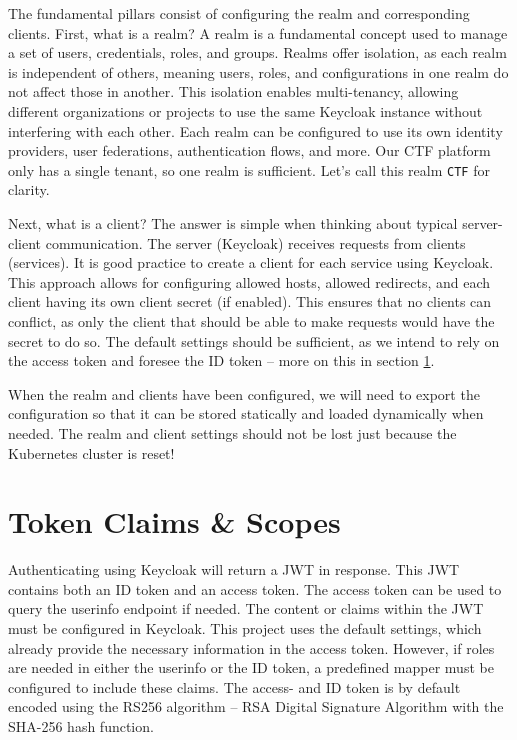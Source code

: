 The fundamental pillars consist of configuring the realm and corresponding clients. First, what is a realm? A realm is a fundamental concept used to manage a set of users, credentials, roles, and groups. Realms offer isolation, as each realm is independent of others, meaning users, roles, and configurations in one realm do not affect those in another. This isolation enables multi-tenancy, allowing different organizations or projects to use the same Keycloak instance without interfering with each other. Each realm can be configured to use its own identity providers, user federations, authentication flows, and more. Our CTF platform only has a single tenant, so one realm is sufficient. Let's call this realm \texttt{CTF} for clarity.

Next, what is a client? The answer is simple when thinking about typical server-client communication. The server (Keycloak) receives requests from clients (services). It is good practice to create a client for each service using Keycloak. This approach allows for configuring allowed hosts, allowed redirects, and each client having its own client secret (if enabled). This ensures that no clients can conflict, as only the client that should be able to make requests would have the secret to do so. The default settings should be sufficient, as we intend to rely on the access token and foresee the ID token -- more on this in section \ref{sec:token_claims}.

When the realm and clients have been configured, we will need to export the configuration so that it can be stored statically and loaded dynamically when needed. The realm and client settings should not be lost just because the Kubernetes cluster is reset!


\section{Token Claims \& Scopes}\label{sec:token_claims}
Authenticating using Keycloak will return a JWT in response. This JWT contains both an ID token and an access token. The access token can be used to query the userinfo endpoint if needed. The content or claims within the JWT must be configured in Keycloak. This project uses the default settings, which already provide the necessary information in the access token. However, if roles are needed in either the userinfo or the ID token, a predefined mapper must be configured to include these claims. The access- and ID token is by default encoded using the RS256 algorithm -- RSA Digital Signature Algorithm with the SHA-256 hash function.

